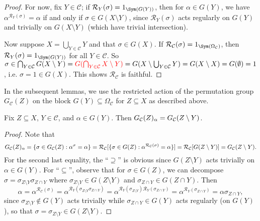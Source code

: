 \begin{proof}
    For now, fix $Y \in \mathcal{C}$; if $\mathcal{R}_Y(\sigma) = 1_{\Sym(G(Y))}$, then for $\alpha \in G(Y)$, we have $\alpha^{\mathcal{R}_Y(\sigma)} = \alpha$ if and only if $\sigma \in G(X \setminus Y)$, since $\mathcal{R}_Y(\sigma)$ acts regularly on $G(Y)$ and trivially on $G(X \setminus Y)$ (which have trivial intersection).

    Now suppose $X = \bigcup_{Y \in \mathcal{C}} Y$ and that $\sigma \in G(X)$. If $\mathcal{R}_\mathcal{C}(\sigma) = 1_{\Sym(\Omega_\mathcal{C})}$, then $\mathcal{R}_Y(\sigma) = 1_{\Sym(G(Y))}$ for all $Y \in \mathcal{C}$. So $\sigma \in \bigcap_{Y \in \mathcal{C}} G(X \setminus Y) = \added{3}{G(\bigcap_{Y \in \mathcal{C}} X \setminus Y)} = G(X \setminus \bigcup_{Y \in \mathcal{C}} Y) = G(X \setminus X) = G(\emptyset) = 1$, i.e. $\sigma = 1 \in G(X)$. This shows $\mathcal{R}_\mathcal{C}$ is faithful.
\end{proof}

In the subsequent lemmas, we use the restricted action of the permutation group $G_\mathcal{C}(Z)$ on the block $G(Y) \subseteq \Omega_\mathcal{C}$ for $Z \subseteq X$ as described above.

\begin{lemma}\label{lem:blaha_elem_stabiliser}
    Fix $Z \subseteq X$,  $Y \in \mathcal{C}$, and $\alpha \in G(Y)$. Then $\added{2}{G_\mathcal{C}(Z)_\alpha} = G_\mathcal{C}(Z \setminus Y)$.
\end{lemma}

\begin{proof}
    Note that
    $$\added{2}{G_\mathcal{C}(Z)_\alpha} = \{\sigma \in G_\mathcal{C}(Z) : \alpha^\sigma = \alpha\} = \mathcal{R}_\mathcal{C}[\{\sigma \in G(Z) : \alpha^{\mathcal{R}_\mathcal{C}(\sigma)} = \alpha\}] = \mathcal{R}_\mathcal{C}[G(Z \setminus Y)] = G_\mathcal{C}(Z \setminus Y).$$
    For the second last equality, the ``$\supseteq$'' is obvious since $G(Z \setminus Y)$ acts trivially on $\alpha \in G(Y)$. For ``$\subseteq$'', observe that for $\sigma \in G(Z)$, we can decompose $\sigma = \sigma_{Z \setminus Y} \sigma_{Z \cap Y}$ where $\sigma_{Z \setminus Y} \in G(Z \setminus Y)$ and $\sigma_{Z \cap Y} \in G(Z \cap Y)$. Then
    $$\alpha = \alpha^{\mathcal{R}_\mathcal{C}(\sigma)} = \alpha^{\mathcal{R}_Y(\sigma_{Z \setminus Y} \sigma_{Z \cap Y})} = \alpha^{\mathcal{R}_Y(\sigma_{Z \setminus Y})\mathcal{R}_Y(\sigma_{Z \cap Y})} = \alpha^{\mathcal{R}_Y(\sigma_{Z \cap Y})} = \alpha\sigma_{Z \cap Y},$$
     since $\sigma_{Z \setminus Y} \not\in G(Y)$ acts trivially while $\sigma_{Z \cap Y} \in G(Y)$ acts regularly (on $G(Y)$), so that $\sigma = \sigma_{Z \setminus Y} \in G(Z \setminus Y)$.
\end{proof}


